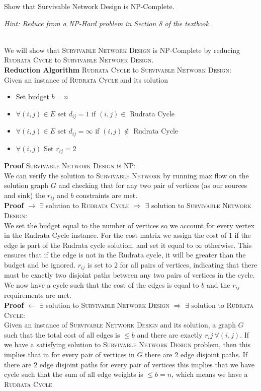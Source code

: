 \documentclass[11pt]{article}
\begin{document}
Show that Survivable Network Design is NP-Complete. 

\emph{Hint: Reduce from a NP-Hard problem in Section 8 of the textbook.}\\
\begin{solution}\\
    We will show that \textsc{Survivable Network Design} is NP-Complete by reducing \textsc{Rudrata Cycle} to \textsc{Survivable Network Design}.\\
    \textbf{Reduction Algorithm} \textsc{Rudrata Cycle} to \textsc{Survivable Network Design}:\\
    Given an instance of \textsc{Rudrata Cycle} and its solution
    \begin{itemize}
        \item Set budget $b=n$
        \item $\forall (i,j) \in E$ set $d_{ij}=1$ if $(i, j) \in $ Rudrata Cycle
        \item $\forall (i, j) \in E$ set $d_{ij}=\infty$ if $(i, j) \not \in$ Rudrata Cycle
        \item $\forall (i, j)$ Set $r_{ij} = 2$
    \end{itemize}
    \textbf{Proof} \textsc{Survivable Network Design} is NP:\\
    We can verify the solution to \textsc{Survivable Network} by running max flow on the solution graph $G$ and checking that for any two pair of vertices (as our sources and sink)
    the $r_{ij}$ and $b$ constraints are met.\\ 
    \textbf{Proof $\rightarrow$ }$\exists$ solution to \textsc{Rudrata Cycle} $\Rightarrow$ $\exists$ solution to \textsc{Survivable Network Design}:\\
    We set the budget equal to the number of vertices so we account for every vertex in the Rudrata Cycle instance. For the cost 
    matrix we assign the cost of 1 if the edge is part of the Rudrata cycle solution, and set it equal to $\infty$ otherwise. This ensures 
    that if the edge is not in the Rudrata cycle, it will be greater than the budget and be ignored. $r_{ij}$ is set to 2 for all pairs of vertices, indicating that there must 
    be exactly two disjoint paths between any two pairs of vertices in the cycle. We now have a cycle such that the 
    cost of the edges is equal to $b$ and the $r_{ij}$ requirements are met.\\
    \textbf{Proof $\leftarrow$ }$\exists$ solution to \textsc{Survivable Network Design} $\Rightarrow$ $\exists$ solution to \textsc{Rudrata Cycle}:\\
    Given an instance of \textsc{Survivable Network Design} and its solution, a graph $G$ such that the total cost of all edges is $\leq b$ and there are exactly $r_ij ~\forall(i, j)$.
    If we have a satisfying solution to \textsc{Survivable Network Design} problem, then this implies that in for every pair of vertices in 
    $G$ there are 2 edge disjoint paths. If there are 2 edge disjoint paths for every pair of vertices this implies that we have cycle such that 
    the sum of all edge weights is $\leq b=n$, which means we have a \textsc{Rudrata Cycle}\\
\end{solution}
\newpage
\end{document}
